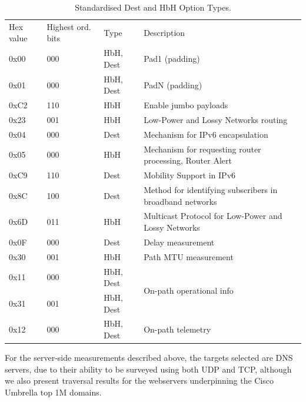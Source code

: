\documentclass[conference]{IEEEtran}
\begin{document}
\begin{table}[]
\begin{tabular}{p{}|p{}|l|p{}}
Hex value & Highest ord. bits & Type      & Description                                              \\
0x00      & 000               & HbH, Dest & Pad1 (padding)                                           \\
0x01      & 000               & HbH, Dest & PadN (padding)                                           \\
0xC2      & 110               & HbH       & Enable jumbo payloads                                    \\
0x23      & 001               & HbH       & Low-Power and Lossy Networks routing                     \\
0x04      & 000               & Dest      & Mechanism for IPv6 encapsulation                 \\
0x05      & 000               & HbH       & Mechanism for requesting router processing, Router Alert              \\
0xC9      & 110               & Dest      & Mobility Support in IPv6                                 \\
0x8C      & 100               & Dest      & Method for identifying subscribers in broadband networks \\
0x6D      & 011               & HbH       & Multicast Protocol for Low-Power and  Lossy Networks     \\
0x0F      & 000               & Dest      & Delay measurement                                        \\
0x30      & 001               & HbH       & Path MTU measurement                                     \\
0x11      & 000               & HbH, Dest & \multirow{2}{*}{On-path operational info}                \\
0x31      & 001               & HbH, Dest &                                                          \\
0x12      & 000               & HbH, Dest & On-path telemetry                                       
\end{tabular}
  \caption{Standardised Dest and HbH Option Types.}
  \label{tbl:options}
\end{table}

For the server-side measurements described above, the targets selected are DNS servers, due to their ability to be surveyed using both UDP and TCP, although we also present traversal results for the webservers underpinning the Cisco Umbrella top 1M domains.
\end{document}

